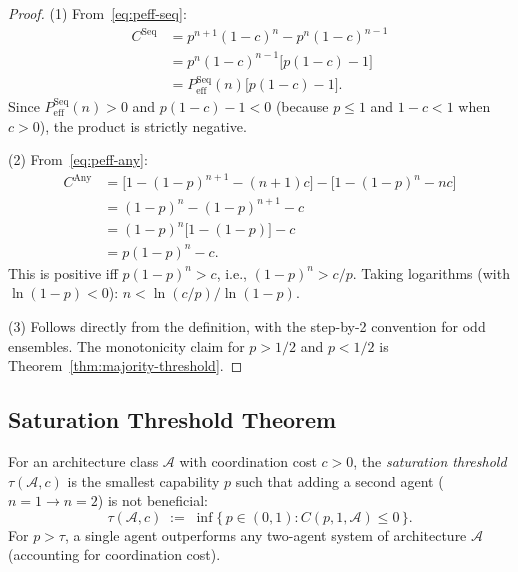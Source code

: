 \begin{proof}
(1) From~\eqref{eq:peff-seq}:
\begin{align*}
  C^{\mathrm{Seq}} &= p^{n+1}(1-c)^n - p^n(1-c)^{n-1} \\
  &= p^n(1-c)^{n-1}\bigl[p(1-c) - 1\bigr] \\
  &= P_{\mathrm{eff}}^{\mathrm{Seq}}(n)\bigl[p(1-c) - 1\bigr].
\end{align*}
Since $P_{\mathrm{eff}}^{\mathrm{Seq}}(n) > 0$ and $p(1-c) - 1 < 0$ (because
$p \leq 1$ and $1-c < 1$ when $c > 0$), the product is strictly negative.

(2) From~\eqref{eq:peff-any}:
\begin{align*}
  C^{\mathrm{Any}} &= \bigl[1-(1-p)^{n+1} - (n+1)c\bigr] - \bigl[1-(1-p)^n - nc\bigr] \\
  &= (1-p)^n - (1-p)^{n+1} - c \\
  &= (1-p)^n\bigl[1-(1-p)\bigr] - c \\
  &= p(1-p)^n - c.
\end{align*}
This is positive iff $p(1-p)^n > c$, i.e., $(1-p)^n > c/p$. Taking logarithms
(with $\ln(1-p) < 0$): $n < \ln(c/p)/\ln(1-p)$.

(3) Follows directly from the definition, with the step-by-2 convention for odd
ensembles. The monotonicity claim for $p > 1/2$ and $p < 1/2$ is
Theorem~\ref{thm:majority-threshold}.
\end{proof}

\subsection{Saturation Threshold Theorem}
\label{subsec:saturation}

\begin{definition}
\label{def:saturation-threshold}
For an architecture class $\mathcal{A}$ with coordination cost $c > 0$, the
\emph{saturation threshold} $\tau(\mathcal{A}, c)$ is the smallest capability $p$
such that adding a second agent ($n = 1 \to n = 2$) is not beneficial:
\[
  \tau(\mathcal{A}, c) \;:=\; \inf\bigl\{\, p \in (0,1) : C(p, 1, \mathcal{A}) \leq 0 \,\bigr\}.
\]
For $p > \tau$, a single agent outperforms any two-agent system of architecture
$\mathcal{A}$ (accounting for coordination cost).
\end{definition}

